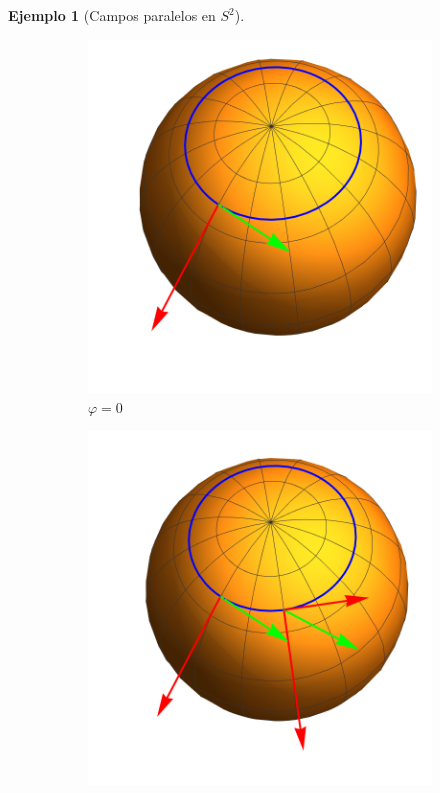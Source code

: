 \documentclass[spanish]{book}
\theoremstyle{definition}
\newtheorem*{ejem}{Ejemplo}
\begin{document}
\begin{ejem}[Campos paralelos en $S^2$]
	\begin{figure}[H]
	\begin{center}
		\begin{subfigure}[t]{0.4\linewidth}
			\centering
			\includegraphics[width=\linewidth]{fig15a}
			\caption*{$\varphi=0$}
		\end{subfigure}
		\begin{subfigure}[t]{0.4\linewidth}
			\centering
			\includegraphics[width=\linewidth]{fig15b}

\end{subfigure}
\end{center}
\end{figure}
\end{ejem}
\end{document}
